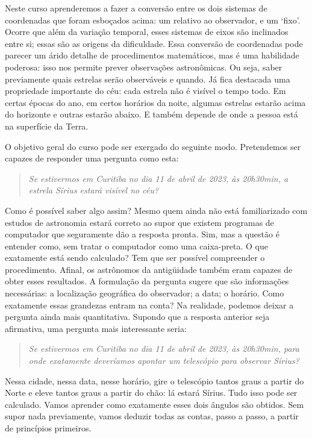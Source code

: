 Neste curso aprenderemos a fazer a conversão entre os dois sistemas de coordenadas que foram esboçados acima: um relativo ao observador, e um `fixo'. Ocorre que além da variação temporal, esses sistemas de eixos são inclinados entre si; essas são as origens da dificuldade. Essa conversão de coordenadas pode parecer um árido detalhe de procedimentos matemáticos, mas é uma habilidade poderosa: isso nos permite prever observações astronômicas. Ou seja, saber previamente quais estrelas serão observáveis e quando. Já fica destacada uma propriedade importante do céu: cada estrela não é visível o tempo todo. Em certas épocas do ano, em certos horários da noite, algumas estrelas estarão acima do horizonte e outras estarão abaixo. E também depende de onde a pessoa está na superfície da Terra.

O objetivo geral do curso pode ser exergado do seguinte modo. Pretendemos ser capazes de responder uma pergunta como esta:
%
\begin{quote}
\itshape Se estivermos em Curitiba no dia 11 de abril de 2023, às 20h30min, a estrela Sírius estará visível no céu?
\end{quote}
%
Como é possível saber algo assim? Mesmo quem ainda não está familiarizado com estudos de astronomia estará correto ao supor que existem programas de computador que seguramente dão a resposta pronta. Sim, mas a questão é entender como, sem tratar o computador como uma caixa-preta. O que exatamente está sendo calculado? Tem que ser possível compreender o procedimento. Afinal, os astrônomos da antigüidade também eram capazes de obter esses resultados. A formulação da pergunta sugere que são informações necessárias: a localização geográfica do observador; a data; o horário. Como exatamente essas grandezas entram na conta? Na realidade, podemos deixar a pergunta ainda mais quantitativa. Supondo que a resposta anterior seja afirmativa, uma pergunta mais interessante seria:
%
\begin{quote}
\itshape Se estivermos em Curitiba no dia 11 de abril de 2023, às 20h30min, para onde exatamente deveríamos apontar um telescópio para observar Sírius?
\end{quote}
%
Nessa cidade, nessa data, nesse horário, gire o telescópio tantos graus a partir do Norte e eleve tantos graus a partir do chão: lá estará Sírius. Tudo isso pode ser calculado. Vamos aprender como exatamente esses dois ângulos são obtidos. Sem supor nada previamente, vamos deduzir todas as contas, passo a passo, a partir de princípios primeiros.

